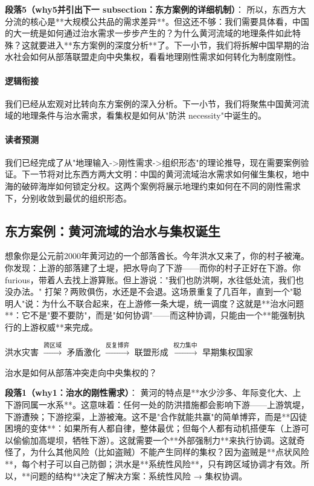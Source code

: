 \documentclass[openany, a4paper, 12pt]{book}
\newenvironment{logicmap}{
	\begin{tcolorbox}[
		colback=blue!5!white,      %
		colframe=blue!50!black,    %
		title=\textbf{逻辑地图 (Logic Map)}, %
		fonttitle=\bfseries,
		sharp corners=south,       %
		boxrule=0.5mm
		]
	\centering
	}{
	\end{tcolorbox}
}
\newenvironment{motivation}{
	\vspace{0.5em}
	\begin{tcolorbox}[
		colback=gray!10,           %
		colframe=gray!60,          %
		title=\textit{本章动机 (Motivation)},
		fonttitle=\bfseries,
		arc=0mm,                   %
		leftrule=3mm               %
		]
		\small \itshape %
	}{
	\end{tcolorbox}
	\vspace{1em}
}
\begin{document}
	\textbf{段落5（why5并引出下一 subsection：东方案例的详细机制）}：  
	所以，东西方大分流的核心是**大规模公共品的需求差异**。但这还不够：我们需要具体看，中国的大一统是如何通过治水需求一步步产生的？为什么黄河流域的地理条件如此特殊？这就要进入**东方案例的深度分析**了。下一小节，我们将拆解中国早期的治水社会如何从部落联盟走向中央集权，看看地理刚性需求如何转化为制度刚性。
	
	\paragraph*{逻辑衔接}
	我们已经从宏观对比转向东方案例的深入分析。下一小节，我们将聚焦中国黄河流域的地理条件与治水需求，看集权是如何从"防洪 necessity"中诞生的。
	
	\paragraph*{读者预测}
	我们已经完成了从"地理输入->刚性需求->组织形态"的理论推导，现在需要案例验证。下一节将对比东西方两大文明：中国的黄河流域治水需求如何催生集权，地中海的破碎海岸如何锁定分权。这两个案例将展示地理约束如何在不同的刚性需求下，分别收敛到最优的组织形态。

	\subsection{东方案例：黄河流域的治水与集权诞生}
	
	\begin{motivation}
		想象你是公元前2000年黄河边的一个部落酋长。今年洪水又来了，你的村子被淹。你发现：上游的部落建了土堤，把水导向了下游——而你的村子正好在下游。你 furious，带着人去找上游算账。但上游说："我们也防洪啊，水往低处流，我们也没办法。" 打架？两败俱伤，水还是不会退。这场景重复了几百年，直到一个"聪明人"说：为什么不联合起来，在上游修一条大堤，统一调度？这就是**治水问题**：它不是"要不要防"，而是"如何协调"——而这种协调，只能由一个**能强制执行的上游权威**来完成。
	\end{motivation}
	
	\begin{logicmap}
		洪水灾害 $\xrightarrow{\text{跨区域}}$ 矛盾激化 $\xrightarrow{\text{反复博弈}}$ 联盟形成 $\xrightarrow{\text{权力集中}}$ 早期集权国家
	\end{logicmap}
	
	\begin{questionbox}
		治水是如何从部落冲突走向中央集权的？
	\end{questionbox}
	
	\textbf{段落1（why1：治水的刚性需求）}：  
	黄河的特点是**水少沙多、年际变化大、上下游同属一水系**。这意味着：任何一处的防洪措施都会影响下游——上游筑堤，下游遭殃；下游挖渠，上游被淹。这不是"合作就能共赢"的简单博弈，而是**囚徒困境的变体**：如果所有人都自律，整体最优；但每个人都有动机搭便车（上游可以偷偷加高堤坝，牺牲下游）。这就需要一个**外部强制力**来执行协调。这就奇怪了，为什么其他风险（比如盗贼）不能产生同样的集权？因为盗贼是**点状风险**，每个村子可以自己防御；洪水是**系统性风险**，只有跨区域协调才有效。所以，**问题的结构**决定了解决方案：系统性风险 → 集权协调。
	
\end{document}
